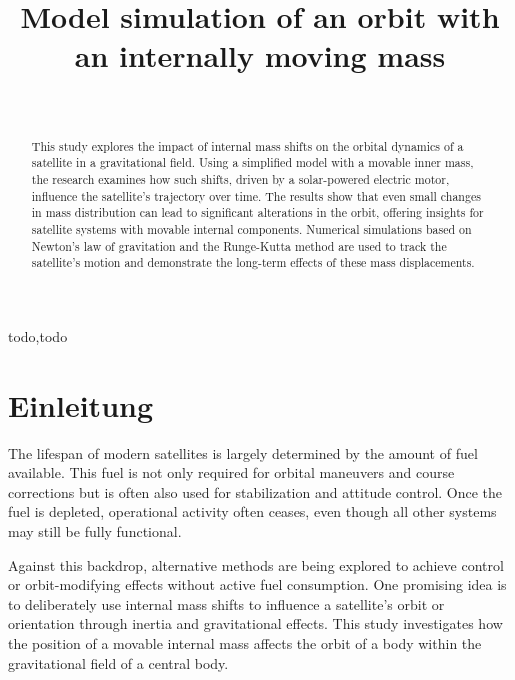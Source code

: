 \documentclass[conference]{IEEEtran}
\begin{document}
\title{Model simulation of an orbit with an internally moving mass\\
}

\author{
 \\
}

\maketitle

\begin{abstract}
This study explores the impact of internal mass shifts on the orbital dynamics of a satellite in a gravitational field. Using a simplified model with a movable inner mass, the research examines how such shifts, driven by a solar-powered electric motor, influence the satellite's trajectory over time. The results show that even small changes in mass distribution can lead to significant alterations in the orbit, offering insights for satellite systems with movable internal components. Numerical simulations based on Newton’s law of gravitation and the Runge-Kutta method are used to track the satellite's motion and demonstrate the long-term effects of these mass displacements.
\end{abstract}

\begin{IEEEkeywords}
    todo,todo
\end{IEEEkeywords}

\section{Einleitung}

The lifespan of modern satellites is largely determined by the amount of fuel available. This fuel is not only required for orbital maneuvers and course corrections but is often also used for stabilization and attitude control. Once the fuel is depleted, operational activity often ceases, even though all other systems may still be fully functional.

Against this backdrop, alternative methods are being explored to achieve control or orbit-modifying effects without active fuel consumption. One promising idea is to deliberately use internal mass shifts to influence a satellite’s orbit or orientation through inertia and gravitational effects. This study investigates how the position of a movable internal mass affects the orbit of a body within the gravitational field of a central body.
\end{document}
